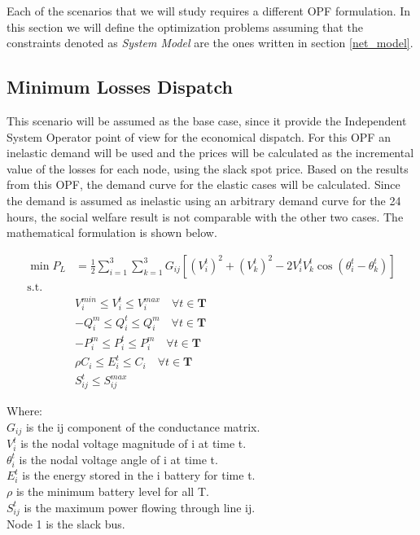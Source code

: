Each of the scenarios that we will study requires a different OPF formulation. In this section we will define the optimization problems assuming that the constraints denoted as \textit{System Model} are the ones written in section \ref{net_model}.

\subsection{Minimum Losses Dispatch}

This scenario will be assumed as the base case, since it provide the Independent System Operator point of view for the economical dispatch. For this OPF an inelastic demand will be used and the prices will be calculated as the incremental value of the losses for each node, using the slack spot price. Based on the results from this OPF, the demand curve for the elastic cases will be calculated. Since the demand is assumed as inelastic using an arbitrary demand curve for the 24 hours, the social welfare result is not comparable with the other two cases. The mathematical formulation is shown below.

\begin{align}
    \min{P_L} &= \frac{1}{2}\sum_{i=1}^3\sum_{k=1}^3 G_{ij}[(V^t_i)^2+(V^t_k)^2-2V^t_iV^t_k\cos(\theta^t_i-\theta^t_k)]\\
   \mbox{s.t.}\\
    &V_i^{min}\le  V_i^t \le V_i^{max} \quad \forall t\in \mathbf{T}\\
    &-Q_i^m\le  Q_i^t \le Q_i^m \quad \forall t\in \mathbf{T}\\
    &-P_i^m\le  P_i^t \le P_i^m \quad \forall t\in \mathbf{T}\\
    &\rho C_i \le  E_i^t \le C_i \quad \forall t\in \mathbf{T}\\
    &S^t_{ij} \le S_{ij}^{max}
\end{align}

Where:\\
$G_{ij}$ is the ij component of the conductance matrix.\\
$V^t_i$ is the nodal voltage magnitude of i at time t.\\
$\theta^t_i$ is the nodal voltage angle of i at time t.\\
$E_i^t$ is the energy stored in the i battery for time t.\\
$\rho$ is the minimum battery level for all T.\\
$S_{ij}^t$ is the maximum power flowing through line ij.\\

Node 1 is the slack bus.



